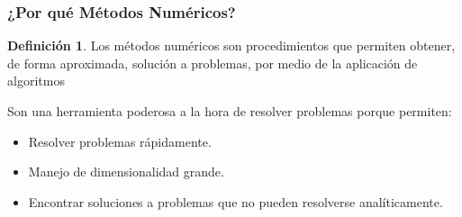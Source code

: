 \documentclass[xcolor=svgnames]{beamer} %
\theoremstyle{plain}
\theoremstyle{definition}
\newtheorem{defi}{Definición}
\begin{document}
\begin{frame}
\frametitle{¿Por qué Métodos Numéricos?}
\begin{tcolorbox}
	\begin{defi}
		Los métodos numéricos son procedimientos que permiten obtener, de forma aproximada, solución a problemas, por medio de la aplicación de algoritmos
	\end{defi}
\end{tcolorbox}


Son una herramienta poderosa a la hora de resolver problemas porque permiten:
\begin{itemize}
	\item Resolver problemas rápidamente.
	\item Manejo de dimensionalidad grande.
	\item Encontrar soluciones a problemas que no pueden resolverse analíticamente.
\end{itemize}

\end{frame}
\end{document}
